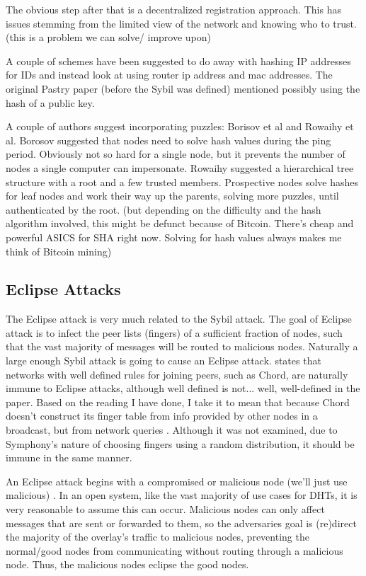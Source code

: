 \documentclass[10pt,letterpaper]{report}
\begin{document}
The obvious step after that is a decentralized registration approach. This has issues stemming from the limited view of the network and knowing who to trust.  (this is a problem we can solve/ improve upon)

A couple of schemes have been suggested to do away with hashing  IP addresses for IDs and instead  look at using router ip address and mac addresses.   The original Pastry paper (before the Sybil was defined) mentioned possibly using the hash of a public key.

A couple of authors suggest incorporating puzzles: Borisov et al and Rowaihy et al.  Borosov suggested that nodes need to solve hash values during the ping period.  Obviously not so hard for a single node, but it prevents the number of nodes a single computer can impersonate.  Rowaihy suggested a hierarchical tree structure with a root and a few trusted members. Prospective nodes solve hashes for leaf nodes and work their way up the parents, solving more puzzles, until authenticated by the root.   (but depending on the difficulty  and the hash algorithm involved, this might be defunct because of Bitcoin.  There's cheap and powerful ASICS for SHA right now.  Solving for hash values always makes me think of Bitcoin mining)



\subsection{Eclipse Attacks}
The Eclipse attack is very much related to the Sybil attack.  The goal of Eclipse attack is to infect the peer lists (fingers) of a sufficient fraction of nodes, such that the vast majority of messages will be routed to malicious nodes.  Naturally  a large enough Sybil attack is  going to cause an Eclipse attack. \cite{dhtsec} states that networks with well defined rules for joining peers, such as Chord, are naturally immune to Eclipse attacks, although well defined is not... well, well-defined in the paper.  Based on the reading I have done, I take it to mean that because Chord doesn't construct its finger table from info provided by other nodes in a broadcast, but from network queries .  Although it was not examined, due to Symphony's nature of choosing  fingers using a random distribution, it should be immune in the same manner.

An Eclipse attack begins with a compromised or malicious node (we'll just use malicious) \cite{induced}.  In an open system, like the vast majority of use cases for DHTs, it is very reasonable to assume this can occur.  Malicious nodes can only affect messages that are sent or forwarded to them, so the adversaries  goal is (re)direct the majority of the overlay's traffic to malicious nodes, preventing the normal/good nodes from communicating without routing through a malicious node.   Thus, the malicious nodes eclipse the good nodes.
\end{document}
